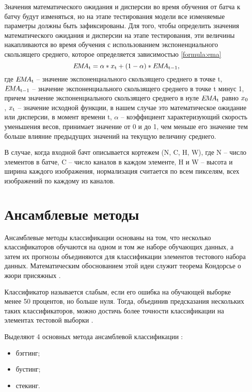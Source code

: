 Значения математического ожидания и дисперсии во время обучения от батча к батчу будут изменяться, но на этапе тестирования модели все изменяемые параметры должны быть зафиксированы. Для того, чтобы определить значения математического ожидания и дисперсии на этапе тестирования, эти величины накапливаются во время обучения с использованием экспоненциального скользящего среднего, которое определяется зависимостью \ref{formula:ema} \begin{equation}\label{formula:ema}
E\!M\!A_{\rm{t}} = \alpha * x_{\rm{t}} + (1 - \alpha) * E\!M\!A_{\rm{t-1}},
\end{equation}
где $E\!M\!A_{\rm{t}}$ -- значение экспоненциального скользящего среднего в точке t, $E\!M\!A_{\rm{t-1}}$ -- значение экспоненциального скользящего среднего в точке t минус 1, причем значение экспоненциального скользящего среднего в нуле $E\!M\!A_{\rm{t}}$ равно $x_{\rm{0}}$, $x_{\rm{t}}$ -- значение исходной функции, в нашем случае это математическое ожидание или дисперсии, в момент времени t, $\alpha$ -- коэффициент характеризующий скорость уменьшения весов, принимает значение от 0 и до 1, чем меньше его значение тем больше влияние предыдущих значений на текущую величину среднего.

В случае, когда входной бачт описывается кортежем (N, C, H, W), где N -- число элементов в батче, C -- число каналов в каждом элементе, H и W -- высота и ширина каждого изображения, нормализация считается по всем пикселям, всех изображений по каждому из каналов.

\section{Ансамблевые методы}
Ансамблевые методы классификации основаны на том, что несколько классификаторов обучаются на одном и том же наборе обучающих данных, а затем их прогнозы объединяются для классификации элементов тестового набора данных. Математическим обоснованием этой идеи служит теорема Кондорсье о жюри присяжных \cite{ansambles}.

Классификатор называется слабым, если его ошибка на обучающей выборке менее 50 процентов, но больше нуля. Тогда, объединив предсказания нескольких таких классификаторов, можно достичь более точности классификации на элементах тестовой выборки \cite{ansambles}.

Выделяют 4 основных метода ансамблевой классификации \cite{ansambles}:
\begin{itemize}
	\item бэггинг;
	\item бустинг;
	\item стекинг.
\end{itemize}

